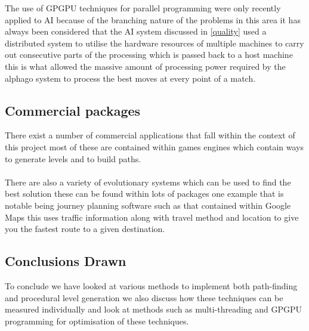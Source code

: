 The use of GPGPU techniques for parallel programming were only recently applied to AI because of the branching nature of the problems in this area it has always been considered that  the AI system discussed in \ref{quality} used a distributed system to utilise the hardware resources of multiple machines to carry out consecutive parts of the processing which is passed back to a host machine this is what allowed the massive amount of processing power required by the alphago system to process the best moves at every point of a match. 

\subsection{Commercial packages}
There exist a number of commercial applications that fall within the context of this project most of these are contained within  games engines which contain ways to generate levels and to build paths.\\\\ There are also a variety of evolutionary systems which can be used to find the best solution these can be found within lots of packages one example that is notable being journey planning software such as that contained within Google Maps this uses traffic information along with travel method and location to give you the fastest route to a given destination. 

\subsection{Conclusions Drawn}
To conclude we have looked at various methods to implement both path-finding and procedural level generation we also discuss how these techniques can be measured individually and look at methods such as multi-threading and GPGPU programming for optimisation of these techniques.\\\\  
\pagebreak

